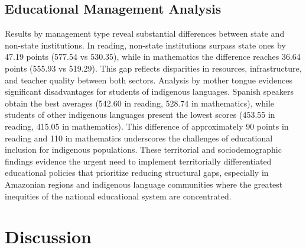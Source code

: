 \documentclass[conference]{IEEEtran}
\begin{document}
\subsection{Educational Management Analysis}
Results by management type reveal substantial differences between state and non-state institutions. In reading, non-state institutions surpass state ones by 47.19 points (577.54 vs 530.35), while in mathematics the difference reaches 36.64 points (555.93 vs 519.29). This gap reflects disparities in resources, infrastructure, and teacher quality between both sectors. Analysis by mother tongue evidences significant disadvantages for students of indigenous languages. Spanish speakers obtain the best averages (542.60 in reading, 528.74 in mathematics), while students of other indigenous languages present the lowest scores (453.55 in reading, 415.05 in mathematics). This difference of approximately 90 points in reading and 110 in mathematics underscores the challenges of educational inclusion for indigenous populations. These territorial and sociodemographic findings evidence the urgent need to implement territorially differentiated educational policies that prioritize reducing structural gaps, especially in Amazonian regions and indigenous language communities where the greatest inequities of the national educational system are concentrated.

\section{Discussion}
\end{document}
